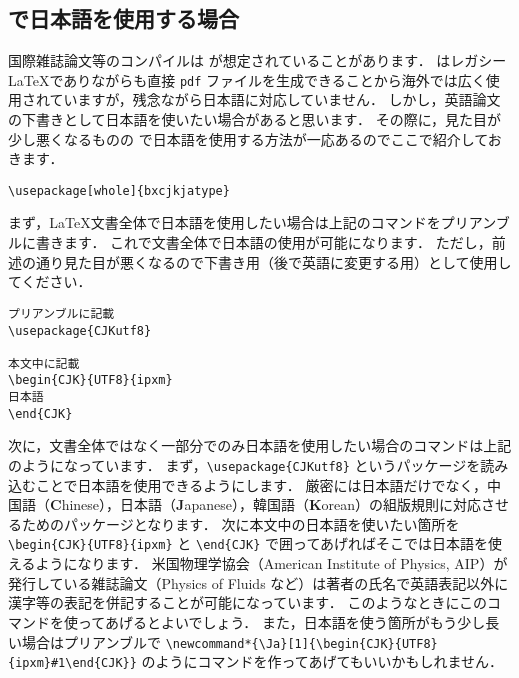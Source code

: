 \subsection{\pdfLaTeX で日本語を使用する場合}
\label{ssec:pdflatex_jp}

国際雑誌論文等のコンパイルは \pdfLaTeX が想定されていることがあります．
\pdfLaTeX はレガシー \LaTeX でありながらも直接 \verb|pdf| ファイルを生成できることから海外では広く使用されていますが，残念ながら日本語に対応していません．
しかし，英語論文の下書きとして日本語を使いたい場合があると思います．
その際に，見た目が少し悪くなるものの \pdfLaTeX で日本語を使用する方法が一応あるのでここで紹介しておきます．

\begin{tcolorbox}[enhanced, title=文書全体で日本語を使用, drop fuzzy shadow]
\begin{verbatim}
\usepackage[whole]{bxcjkjatype}
\end{verbatim}
\end{tcolorbox}

まず，\LaTeX 文書全体で日本語を使用したい場合は上記のコマンドをプリアンブルに書きます．
これで文書全体で日本語の使用が可能になります．
ただし，前述の通り見た目が悪くなるので下書き用（後で英語に変更する用）として使用してください．

\begin{tcolorbox}[enhanced, title=文書の一部分で日本語を使用, drop fuzzy shadow]
\begin{verbatim}
プリアンブルに記載
\usepackage{CJKutf8}

本文中に記載
\begin{CJK}{UTF8}{ipxm}
日本語
\end{CJK}
\end{verbatim}
\end{tcolorbox}

次に，文書全体ではなく一部分でのみ日本語を使用したい場合のコマンドは上記のようになっています．
まず，\verb|\usepackage{CJKutf8}| というパッケージを読み込むことで日本語を使用できるようにします．
厳密には日本語だけでなく，中国語（\textbf{C}hinese），日本語（\textbf{J}apanese），韓国語（\textbf{K}orean）の組版規則に対応させるためのパッケージとなります．
次に本文中の日本語を使いたい箇所を \verb|\begin{CJK}{UTF8}{ipxm}| と \verb|\end{CJK}| で囲ってあげればそこでは日本語を使えるようになります．
米国物理学協会（American Institute of Physics, AIP）が発行している雑誌論文（Physics of Fluids など）は著者の氏名で英語表記以外に漢字等の表記を併記することが可能になっています．
このようなときにこのコマンドを使ってあげるとよいでしょう．
また，日本語を使う箇所がもう少し長い場合はプリアンブルで \verb|\newcommand*{\Ja}[1]{\begin{CJK}{UTF8}{ipxm}#1\end{CJK}}| のようにコマンドを作ってあげてもいいかもしれません．

